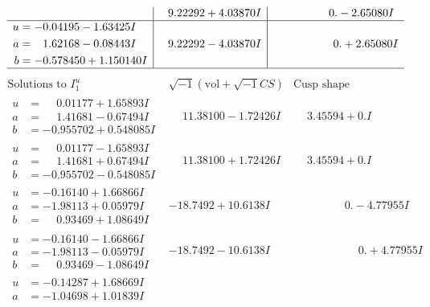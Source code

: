 \documentclass[1p]{elsarticle_modified}
\theoremstyle{definition}
\newcommand{\I}{\sqrt{-1}}
\begin{document}
$$\begin{array}{c|c|c}
 & \phantom{-}9.22292 + 4.03870 I & \phantom{-0.000000 } 0. - 2.65080 I \\ \hline\begin{aligned}
u &= -0.04195 - 1.63425 I \\
a &= \phantom{-}1.62168 - 0.08443 I \\
b &= -0.578450 + 1.150140 I\end{aligned}
 & \phantom{-}9.22292 - 4.03870 I & \phantom{-0.000000 -}0. + 2.65080 I\\
 \hline 
 \end{array}$$\newpage$$\begin{array}{c|c|c}  
\text{Solutions to }I^u_{1}& \I (\text{vol} + \sqrt{-1}CS) & \text{Cusp shape}\\
 \hline 
\begin{aligned}
u &= \phantom{-}0.01177 + 1.65893 I \\
a &= \phantom{-}1.41681 - 0.67494 I \\
b &= -0.955702 + 0.548085 I\end{aligned}
 & \phantom{-}11.38100 - 1.72426 I & \phantom{-}3.45594 + 0. I\phantom{ +0.000000I} \\ \hline\begin{aligned}
u &= \phantom{-}0.01177 - 1.65893 I \\
a &= \phantom{-}1.41681 + 0.67494 I \\
b &= -0.955702 - 0.548085 I\end{aligned}
 & \phantom{-}11.38100 + 1.72426 I & \phantom{-}3.45594 + 0. I\phantom{ +0.000000I} \\ \hline\begin{aligned}
u &= -0.16140 + 1.66866 I \\
a &= -1.98113 + 0.05979 I \\
b &= \phantom{-}0.93469 + 1.08649 I\end{aligned}
 & -18.7492 + 10.6138 I & \phantom{-0.000000 } 0. - 4.77955 I \\ \hline\begin{aligned}
u &= -0.16140 - 1.66866 I \\
a &= -1.98113 - 0.05979 I \\
b &= \phantom{-}0.93469 - 1.08649 I\end{aligned}
 & -18.7492 - 10.6138 I & \phantom{-0.000000 -}0. + 4.77955 I \\ \hline\begin{aligned}
u &= -0.14287 + 1.68669 I \\
a &= -1.04698 + 1.01839 I \\

\end{aligned}
\end{array}$$
\end{document}
